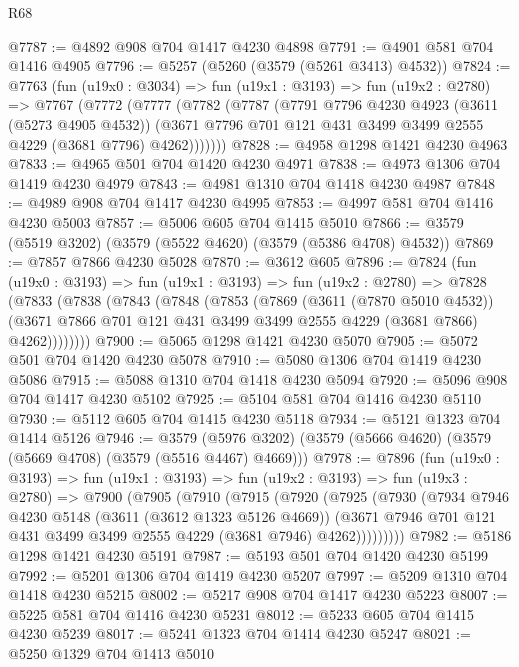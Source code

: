 \begin{lexlean}{R68}
\begin{coremodule}
@7787 := @4892 @908 @704 @1417 @4230 @4898
@7791 := @4901 @581 @704 @1416 @4905
@7796 := @5257 (@5260 (@3579 (@5261 @3413) @4532))
@7824 := @7763
    (fun (u19x0 : @3034) =>
    fun (u19x1 : @3193) =>
    fun (u19x2 : @2780) =>
    @7767
      (@7772
        (@7777
          (@7782
            (@7787
              (@7791
                @7796
                @4230
                @4923
                (@3611 (@5273 @4905 @4532))
                (@3671 @7796 @701 @121 @431 @3499 @3499 @2555 @4229 (@3681 @7796) @4262)))))))
@7828 := @4958 @1298 @1421 @4230 @4963
@7833 := @4965 @501 @704 @1420 @4230 @4971
@7838 := @4973 @1306 @704 @1419 @4230 @4979
@7843 := @4981 @1310 @704 @1418 @4230 @4987
@7848 := @4989 @908 @704 @1417 @4230 @4995
@7853 := @4997 @581 @704 @1416 @4230 @5003
@7857 := @5006 @605 @704 @1415 @5010
@7866 := @3579 (@5519 @3202) (@3579 (@5522 @4620) (@3579 (@5386 @4708) @4532))
@7869 := @7857 @7866 @4230 @5028
@7870 := @3612 @605
@7896 := @7824
    (fun (u19x0 : @3193) =>
    fun (u19x1 : @3193) =>
    fun (u19x2 : @2780) =>
    @7828
      (@7833
        (@7838
          (@7843
            (@7848
              (@7853
                (@7869
                  (@3611 (@7870 @5010 @4532))
                  (@3671 @7866 @701 @121 @431 @3499 @3499 @2555 @4229 (@3681 @7866) @4262))))))))
@7900 := @5065 @1298 @1421 @4230 @5070
@7905 := @5072 @501 @704 @1420 @4230 @5078
@7910 := @5080 @1306 @704 @1419 @4230 @5086
@7915 := @5088 @1310 @704 @1418 @4230 @5094
@7920 := @5096 @908 @704 @1417 @4230 @5102
@7925 := @5104 @581 @704 @1416 @4230 @5110
@7930 := @5112 @605 @704 @1415 @4230 @5118
@7934 := @5121 @1323 @704 @1414 @5126
@7946 := @3579 (@5976 @3202) (@3579 (@5666 @4620) (@3579 (@5669 @4708) (@3579 (@5516 @4467) @4669)))
@7978 := @7896
    (fun (u19x0 : @3193) =>
    fun (u19x1 : @3193) =>
    fun (u19x2 : @3193) =>
    fun (u19x3 : @2780) =>
    @7900
      (@7905
        (@7910
          (@7915
            (@7920
              (@7925
                (@7930
                  (@7934
                    @7946
                    @4230
                    @5148
                    (@3611 (@3612 @1323 @5126 @4669))
                    (@3671 @7946 @701 @121 @431 @3499 @3499 @2555 @4229 (@3681 @7946) @4262)))))))))
@7982 := @5186 @1298 @1421 @4230 @5191
@7987 := @5193 @501 @704 @1420 @4230 @5199
@7992 := @5201 @1306 @704 @1419 @4230 @5207
@7997 := @5209 @1310 @704 @1418 @4230 @5215
@8002 := @5217 @908 @704 @1417 @4230 @5223
@8007 := @5225 @581 @704 @1416 @4230 @5231
@8012 := @5233 @605 @704 @1415 @4230 @5239
@8017 := @5241 @1323 @704 @1414 @4230 @5247
@8021 := @5250 @1329 @704 @1413 @5010

\end{coremodule}
\end{lexlean}
